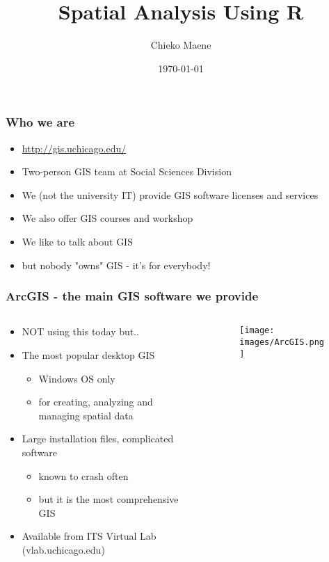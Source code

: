 \documentclass[11pt]{beamer}
\begin{document}
\title[Spatial Analysis Using R]
{Spatial Analysis Using R}
\author{Chieko Maene}
\date {\today}

\begin{frame}
\titlepage{}
\end{frame}


\begin{frame}
\frametitle{Who we are}
\begin{itemize}
  \item \href{http://gis.uchicago.edu/}{http://gis.uchicago.edu/}
  \item Two-person GIS team at Social Sciences Division
  \item We (not the university IT) provide GIS software licenses and services
  \item We also offer GIS courses and workshop
  \item We like to talk about GIS
  \item but nobody "owns" GIS - it's for everybody!
\end{itemize}
\end{frame}

\begin{frame}
\frametitle{ArcGIS - the main GIS software we provide}
\begin{columns}
\begin{column}{6cm}
\begin{itemize}
\item NOT using this today but..
\item The most popular desktop GIS
\begin{itemize}
\item Windows OS only
\item for creating, analyzing and managing spatial data
\end{itemize}
\item Large installation files, complicated software
\begin{itemize}
\item  known to crash often
\item  but it is the most comprehensive GIS
\end{itemize}
\item Available from ITS Virtual Lab (vlab.uchicago.edu)
\end{itemize}
\end{column}
\begin{column}{4cm}
\begin{figure}
\begin{center}
\texttt{[image: images/ArcGIS.png]}
\end{center}
\end{figure}
\end{column}
\end{columns}
\end{frame}
\end{document}
